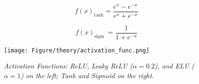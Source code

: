 \\
\begin{minipage}{0.5\textwidth}
	\begin{equation}
		f(x)_{\tanh }=\frac{e^x-e^{-x}}{e^x+e^{-x}}
		\label{eq:tanh}
	\end{equation}
\end{minipage}%
\begin{minipage}{0.5\textwidth}
	\begin{equation}
		f(x)_{\text {sigm }}=\frac{1}{1+e^{-x}}
		\label{eq:sigm}
	\end{equation}
\end{minipage}

\begin{figure}[h]
	\centering
	\texttt{[image: Figure/theory/activation\_func.png]} %
	\caption{\textit{Activation Functions: ReLU, Leaky ReLU ($\alpha = 0.2$), and ELU ($\alpha = 1$) on the left; Tanh and Sigmoid on the right.}}
	\label{fig:activation_func}
\end{figure}

